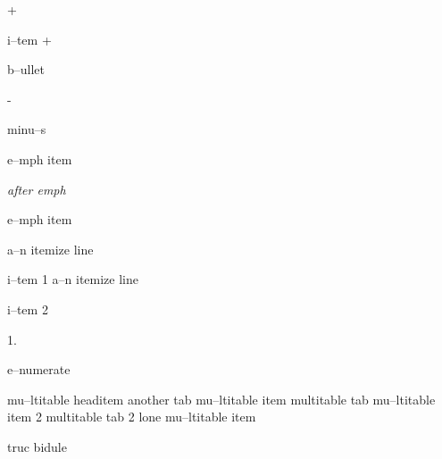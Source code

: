 \documentclass{book}
\begin{document}
+ 

i--tem +

\textbullet{} 

b--ullet

- 

minu--s

\emph{} 

e--mph item

\emph{after emph} 

e--mph item

\textbullet{} a--n itemize line 

i--tem 1
\textbullet{} a--n itemize line 

i--tem 2

1. 

e--numerate

mu--ltitable headitem another tab
mu--ltitable item multitable tab
mu--ltitable item 2 multitable tab 2
lone mu--ltitable item

truc bidule
\end{document}
